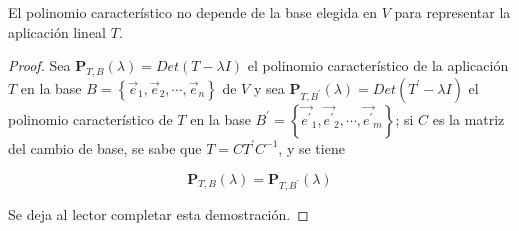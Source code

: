 \begin{theorem}
\label{polcarbase}
El polinomio característico no depende de la base elegida en $V$ para representar la aplicación lineal  $T$.


\begin{proof}


\noindent
Sea $\mathbf{P}_{T,B}(\lambda)=Det(T-\lambda I)$ el polinomio característico  de la aplicación $T$ en la base $B=\left\{\vec{e}_1,\vec{e}_2, \cdots,\vec{e}_n\right\}$  de $V$ y sea  $\mathbf{P}_{T,B^{\prime}}(\lambda)=Det(T^{\prime}-\lambda I)$ el polinomio característico de $T$ en la base $B^{\prime} =\left\{\vec{e ^{\prime}}_1,\vec{ e ^{\prime}}_2,\cdots, \vec{e^{\prime}}_m\right\}$; si $C$ es la matriz del cambio de base, se  sabe que    $T=CT^\prime C^{-1}$, 
y se tiene 

\bigskip

$$\mathbf{P}_{T,B}(\lambda)=\mathbf{P}_{T,B^{\prime}}(\lambda)$$  

Se deja al lector  completar esta demostración.

\end{proof}
\end{theorem}

\bigskip

\bigskip

